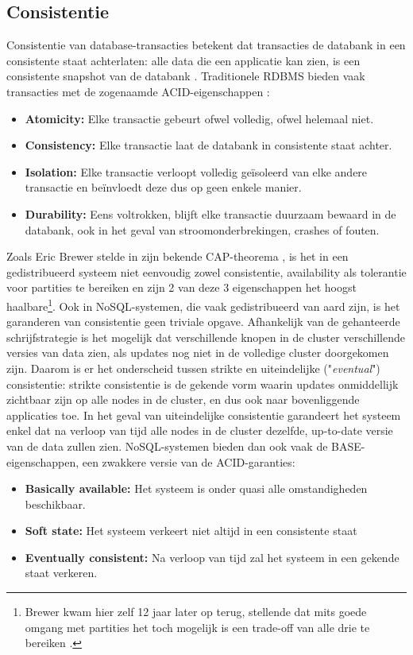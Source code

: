 \subsection{Consistentie}
\label{consistentie}

Consistentie van database-transacties betekent dat transacties de databank in een consistente staat achterlaten: alle data die een applicatie kan zien, is een consistente snapshot van de databank \cite{ports2010transactional}. Traditionele RDBMS bieden vaak transacties met de zogenaamde ACID-eigenschappen \cite{haerder1983principles}:
\begin{itemize}
\item \textbf{Atomicity:} Elke transactie gebeurt ofwel volledig, ofwel helemaal niet.
\item \textbf{Consistency:} Elke transactie laat de databank in consistente staat achter.
\item \textbf{Isolation:} Elke transactie verloopt volledig ge\"isoleerd van elke andere transactie en be\"invloedt deze dus op geen enkele manier.
\item \textbf{Durability:} Eens voltrokken, blijft elke transactie duurzaam bewaard in de databank, ook in het geval van stroomonderbrekingen, crashes of fouten.
\end{itemize}

Zoals Eric Brewer stelde in zijn bekende CAP-theorema \cite{brewer2000towards}, is het in een gedistribueerd systeem niet eenvoudig zowel consistentie, availability als tolerantie voor partities te bereiken en zijn 2 van deze 3 eigenschappen het hoogst haalbare\footnote{Brewer kwam hier zelf 12 jaar later op terug, stellende dat mits goede omgang met partities het toch mogelijk is een trade-off van alle drie te bereiken \cite{brewer2012cap}.}.
Ook in NoSQL-systemen, die vaak gedistribueerd van aard zijn, is het garanderen van consistentie geen triviale opgave. Afhankelijk van de gehanteerde schrijfstrategie is het mogelijk dat verschillende knopen in de cluster verschillende versies van data zien, als updates nog niet in de volledige cluster doorgekomen zijn. Daarom is er het onderscheid tussen strikte en uiteindelijke ("\textit{eventual}") consistentie: strikte consistentie is de gekende vorm waarin updates onmiddellijk zichtbaar zijn op alle nodes in de cluster, en dus ook naar bovenliggende applicaties toe. In het geval van uiteindelijke consistentie garandeert het systeem enkel dat na verloop van tijd alle nodes in de cluster dezelfde, up-to-date versie van de data zullen zien. NoSQL-systemen bieden dan ook vaak de BASE-eigenschappen, een zwakkere versie van de ACID-garanties:
\begin{itemize}
\item \textbf{Basically available:} Het systeem is onder quasi alle omstandigheden beschikbaar.
\item \textbf{Soft state:} Het systeem verkeert niet altijd in een consistente staat
\item \textbf{Eventually consistent:} Na verloop van tijd zal het systeem in een gekende staat verkeren.
\end{itemize}

